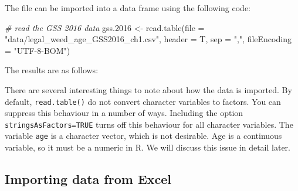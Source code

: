 \documentclass[
]{book}
\newenvironment{Shaded}{\begin{snugshade}}{\end{snugshade}}
\newcommand{\AttributeTok}[1]{\textcolor[rgb]{0.77,0.63,0.00}{#1}}
\newcommand{\CommentTok}[1]{\textcolor[rgb]{0.56,0.35,0.01}{\textit{#1}}}
\newcommand{\FloatTok}[1]{\textcolor[rgb]{0.00,0.00,0.81}{#1}}
\newcommand{\FunctionTok}[1]{\textcolor[rgb]{0.00,0.00,0.00}{#1}}
\newcommand{\NormalTok}[1]{#1}
\newcommand{\OtherTok}[1]{\textcolor[rgb]{0.56,0.35,0.01}{#1}}
\newcommand{\StringTok}[1]{\textcolor[rgb]{0.31,0.60,0.02}{#1}}
\begin{document}
The file can be imported into a data frame using the following code:

\begin{Shaded}
\begin{Highlighting}[]
\CommentTok{\# read the GSS 2016 data }
\NormalTok{gss}\FloatTok{.2016} \OtherTok{\textless{}{-}} \FunctionTok{read.table}\NormalTok{(}\AttributeTok{file =} \StringTok{"data/legal\_weed\_age\_GSS2016\_ch1.csv"}\NormalTok{, }
                       \AttributeTok{header =}\NormalTok{ T, }\AttributeTok{sep =} \StringTok{","}\NormalTok{, }\AttributeTok{fileEncoding =} \StringTok{"UTF{-}8{-}BOM"}\NormalTok{)}
\end{Highlighting}
\end{Shaded}

The results are as follows:

\begin{Shaded}
\end{Shaded}

There are several interesting things to note about how the data is imported. By default, \texttt{read.table()} do not convert character variables to factors. You can suppress this behaviour in a number of ways. Including the option \texttt{stringsAsFactors=TRUE} turns off this behaviour for all character variables. The variable \texttt{age} is a character vector, which is not desirable. Age is a continuous variable, so it must be a numeric in R. We will discuss this issue in detail later.

\hypertarget{importing-data-from-excel}{%
\subsection{Importing data from Excel}\label{importing-data-from-excel}}
\end{document}
